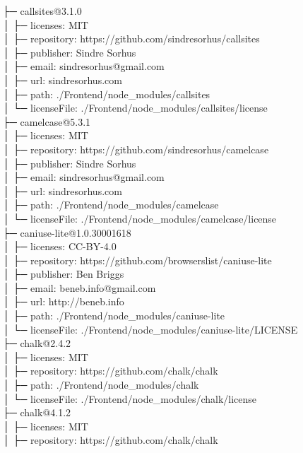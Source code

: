 \documentclass[
    paper=a4,
    twoside=false,
    parskip=half,
    listof=entryprefix,
    listof=totoc,
    index=totoc,
    bibliography=totoc,
    headsepline,
]{scrbook}
\begin{document}
    ├─ callsites@3.1.0\\
    │  ├─ licenses: MIT\\
    │  ├─ repository: https://github.com/sindresorhus/callsites\\
    │  ├─ publisher: Sindre Sorhus\\
    │  ├─ email: sindresorhus@gmail.com\\
    │  ├─ url: sindresorhus.com\\
    │  ├─ path: ./Frontend/node\_modules/callsites\\
    │  └─ licenseFile: ./Frontend/node\_modules/callsites/license\\
    ├─ camelcase@5.3.1\\
    │  ├─ licenses: MIT\\
    │  ├─ repository: https://github.com/sindresorhus/camelcase\\
    │  ├─ publisher: Sindre Sorhus\\
    │  ├─ email: sindresorhus@gmail.com\\
    │  ├─ url: sindresorhus.com\\
    │  ├─ path: ./Frontend/node\_modules/camelcase\\
    │  └─ licenseFile: ./Frontend/node\_modules/camelcase/license\\
    ├─ caniuse-lite@1.0.30001618\\
    │  ├─ licenses: CC-BY-4.0\\
    │  ├─ repository: https://github.com/browserslist/caniuse-lite\\
    │  ├─ publisher: Ben Briggs\\
    │  ├─ email: beneb.info@gmail.com\\
    │  ├─ url: http://beneb.info\\
    │  ├─ path: ./Frontend/node\_modules/caniuse-lite\\
    │  └─ licenseFile: ./Frontend/node\_modules/caniuse-lite/LICENSE\\
    ├─ chalk@2.4.2\\
    │  ├─ licenses: MIT\\
    │  ├─ repository: https://github.com/chalk/chalk\\
    │  ├─ path: ./Frontend/node\_modules/chalk\\
    │  └─ licenseFile: ./Frontend/node\_modules/chalk/license\\
    ├─ chalk@4.1.2\\
    │  ├─ licenses: MIT\\
    │  ├─ repository: https://github.com/chalk/chalk\\
\end{document}

